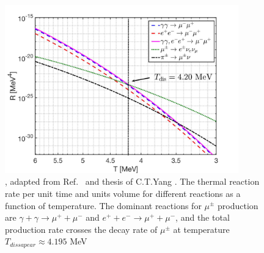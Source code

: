 \begin{figure}
\centerline{\includegraphics[width=0.9\textwidth]{./plots/MuonRate_new2.jpg}}
\caption{, adapted from Ref.~\cite{Rafelski:2021aey} and thesis of C.T.Yang \cite{Yang:2024ret}. The thermal reaction rate per unit time and units volume for different reactions as a function of temperature. The dominant reactions for $\mu^\pm$ production are ${\gamma+\gamma\to\mu^++\mu^-}$ and $e^++e^-\to\mu^++\mu^-$, and the total production rate crosses the decay rate of $\mu^\pm$ at temperature $T_{dissapear}\approx 4.195$ MeV}
\label{MuonRatenew_fig} 
\end{figure}

